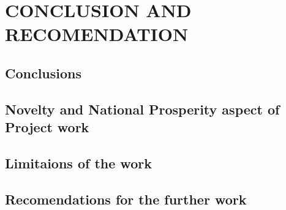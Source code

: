 \chapter{CONCLUSION AND RECOMENDATION}

\section{Conclusions}

\section{Novelty and National Prosperity aspect of Project work}

\section{Limitaions of the work}

\section{Recomendations for the further work}

 

















